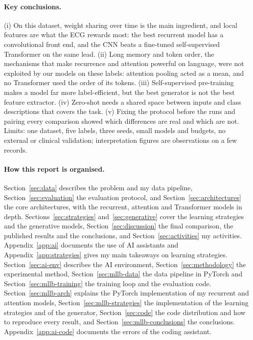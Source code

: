 \paragraph{Key conclusions.}
(i) On this dataset, weight sharing over time is the main ingredient, and local features are what the ECG
rewards most: the best recurrent model has a convolutional front end, and the CNN beats a fine-tuned
self-supervised Transformer on the same lead. (ii) Long memory and token order, the mechanisms that make
recurrence and attention powerful on language, were not exploited by our models on these labels:
attention pooling acted as a mean, and no Transformer used the order of its tokens. (iii) Self-supervised pre-training makes a model
far more label-efficient, but the best generator is not the best feature extractor. (iv) Zero-shot needs a
shared space between inputs and class descriptions that covers the task. (v) Fixing the protocol before the
runs and pairing every comparison showed which differences are real and which are not. Limits: one dataset,
five labels, three seeds, small models and budgets, no external or clinical validation; interpretation
figures are observations on a few records.

\paragraph{How this report is organised.}
\ifprdl
Section~\ref{sec:data} describes the problem and my data pipeline, Section~\ref{sec:evaluation} the
evaluation protocol, and Section~\ref{sec:architectures} the core architectures, with the recurrent,
attention and Transformer models in depth. Sections~\ref{sec:strategies} and~\ref{sec:generative} cover the
learning strategies and the generative models, Section~\ref{sec:discussion} the final comparison, the
published results and the conclusions, and Section~\ref{sec:activities} my activities.
Appendix~\ref{app:ai} documents the use of AI assistants and Appendix~\ref{app:strategies} gives my main
takeaways on learning strategies.
\else
Section~\ref{sec:ai-env} describes the AI environment, Section~\ref{sec:methodology} the experimental
method, Section~\ref{sec:mllb-data} the data pipeline in PyTorch and Section~\ref{sec:mllb-training} the
training loop and the evaluation code. Section~\ref{sec:mllb-arch} explains the PyTorch implementation of
my recurrent and attention models, Section~\ref{sec:mllb-strategies} the implementation of the learning
strategies and of the generator, Section~\ref{sec:code} the code distribution and how to reproduce every
result, and Section~\ref{sec:mllb-conclusions} the conclusions. Appendix~\ref{app:ai-code} documents the
errors of the coding assistant.
\fi
